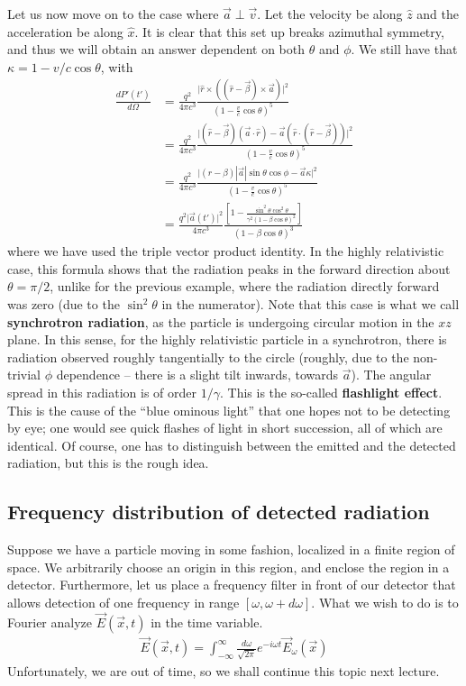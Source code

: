 Let us now move on to the case where $\vec{a}\perp\vec{v}$. Let the velocity be along $\hat{z}$ and the acceleration be along $\hat{x}$. It is clear that this set up breaks azimuthal symmetry,
and thus we will obtain an answer dependent on both $\theta$ and $\phi$. We still have that $\kappa=1-v/c \cos\theta$, with
\begin{align*}
    \frac{dP'(t')}{d\Omega}&=\frac{q^2}{4\pi c^3}\frac{\big|\hat{r}\times\left( (\hat{r}-\vec{\beta})\times \vec{a}\right)\big|^2}{\left( 1-\frac{v}{c}\cos\theta \right)^5}\\
    &=\frac{q^2}{4\pi c^3}\frac{\big|(\hat{r}-\vec{\beta})(\vec{a}\cdot \hat{r})-\vec{a}(\hat{r}\cdot(\hat{r}-\vec{\beta}))\big|^2}{\left( 1-\frac{v}{c}\cos\theta \right)^5}\\
    &=\frac{q^2}{4\pi c^3}\frac{\big|(r-\beta)|\vec{a}|\sin\theta\cos\phi-\vec{a}\kappa\big|^2}{\left( 1-\frac{v}{c}\cos\theta \right)^5}\\
    &=\frac{q^2\big|\vec{a}(t')\big|^2}{4\pi c^3}\frac{\left[ 1-\frac{\sin^2\theta\cos^2\theta}{\gamma^2(1-\beta\cos\theta)^2} \right]}{\left(1-\beta\cos\theta\right)^3}
\end{align*}
where we have used the triple vector product identity. In the highly relativistic case, this formula shows that the radiation peaks in the forward direction about $\theta=\pi/2$,
unlike for the previous example, where the radiation directly forward was zero (due to the $\sin^2\theta$ in the numerator). Note that this case is what we call \textbf{synchrotron radiation},
as the particle is undergoing circular motion in
the $xz$ plane. In this sense, for the highly relativistic particle in a synchrotron, there is radiation observed roughly tangentially to the circle (roughly, due to the non-trivial
$\phi$ dependence -- there is a slight tilt inwards, towards $\vec{a}$). The angular spread in this radiation is of order $1/\gamma$. This is the so-called \textbf{flashlight effect}.
This is the cause of the ``blue ominous light'' that one hopes not to be detecting by eye; one would see quick flashes of light in short succession, all of which are identical. Of course, one has
to distinguish between the emitted and the detected radiation, but this is the rough idea.

\subsection{Frequency distribution of detected radiation}

Suppose we have a particle moving in some fashion, localized in a finite region of space. We arbitrarily choose an origin in this region, and enclose the region in a detector. Furthermore,
let us place a frequency filter in front of our detector that allows detection of one frequency in range $[\omega,\omega+d\omega]$. What we wish to do is to Fourier analyze
$\vec{E}(\vec{x}, t)$ in the time variable.
\begin{align*}
    \vec{E}(\vec{x}, t)=\int_{-\infty}^{\infty} \frac{d\omega}{\sqrt{2\pi}} e^{-i\omega t}\vec{E}_\omega(\vec{x})
\end{align*}
Unfortunately, we are out of time, so we shall continue this topic next lecture.
